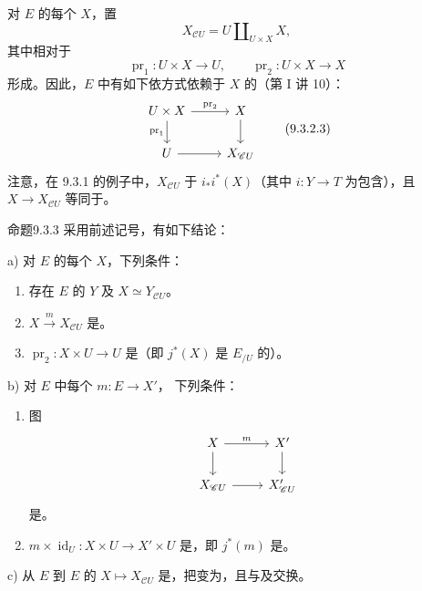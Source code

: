 对 $E$ 的每个 $X$，置
\[
X_{\mathscr C U}=U\amalg_{U\times X}X,\tag{9.3.2.2}
\]
其中相对于
\[
\operatorname{pr}_1:U\times X\longrightarrow U,\qquad
\operatorname{pr}_2:U\times X\longrightarrow X
\]
形成。因此，$E$ 中有如下依方式依赖于 $X$ 的（第 I 讲 10）：
\[
\begin{tikzcd}
U\times X\arrow[r,"\operatorname{pr}_2"]\arrow[d,"\operatorname{pr}_1"']&X\arrow[d]\\
U\arrow[r]&X_{\mathscr C U}
\end{tikzcd}\tag{9.3.2.3}
\]
注意，在 9.3.1 的例子中，$X_{\mathscr C U}$ 于 $i_*i^*(X)$（其中 $i:Y\to T$ 为包含），且 $X\to X_{\mathscr C U}$ 等同于。
\begin{SGAresult}{命题}{9.3.3}
采用前述记号，有如下结论：

a) 对 $E$ 的每个 $X$，下列条件：
\begin{enumerate}[label=(\roman*)]
\item 存在 $E$ 的 $Y$ 及 $X\simeq Y_{\mathscr C U}$。
\item {} $X\xrightarrow{m}X_{\mathscr C U}$ 是。
\item {} $\operatorname{pr}_2:X\times U\to U$ 是（即 $j^*(X)$ 是 $E_{/U}$ 的）。
\end{enumerate}
b) 对 $E$ 中每个 $m:E\to X'$，
下列条件：
\begin{enumerate}[label=(\roman*')]
\item 图
\[
\begin{tikzcd}
X\arrow[r,"m"]\arrow[d]&X'\arrow[d]\\
X_{\mathscr C U}\arrow[r]&X'_{\mathscr C U}
\end{tikzcd}
\]
是。
\item {} $m\times\operatorname{id}_U:X\times U\to X'\times U$ 是，即 $j^*(m)$ 是。
\end{enumerate}
c) 从 $E$ 到 $E$ 的 $X\longmapsto X_{\mathscr C U}$ 是，把变为，且与及交换。
\end{SGAresult}
